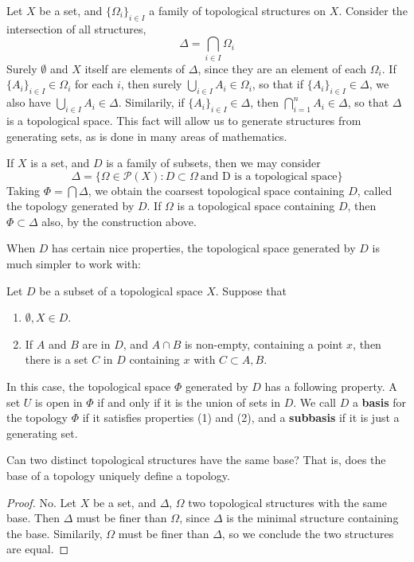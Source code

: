 Let $X$ be a set, and $\{\Omega_i\}_{i \in I}$ a family of topological structures on $X$. Consider the intersection of all structures,
%
\[ \Delta = \bigcap_{i \in I} \Omega_i \]
%
Surely $\emptyset$ and $X$ itself are elements of $\Delta$, since they are an element of each $\Omega_i$. If $\{A_i\}_{i \in I} \in \Omega_i$ for each $i$, then surely $\bigcup_{i \in I} A_i \in \Omega_i$, so that if $\{A_i\}_{i \in I} \in \Delta$, we also have $\bigcup_{i \in I} A_i \in \Delta$. Similarily, if $\{A_i\}_{i \in I} \in \Delta$, then $\bigcap_{i = 1}^n A_i \in \Delta$, so that $\Delta$ is a topological space. This fact will allow us to generate structures from generating sets, as is done in many areas of mathematics.

If $X$ is a set, and $D$ is a family of subsets, then we may consider
%
\[ \Delta = \{ \Omega \in \mathcal{P}(X) : D \subset \Omega\ \text{and D is a topological space} \} \]
%
Taking $\Phi = \bigcap \Delta$, we obtain the coarsest topological space containing $D$, called the topology generated by $D$. If $\Omega$ is a topological space containing $D$, then $\Phi \subset \Delta$ also, by the construction above.

When $D$ has certain nice properties, the topological space generated by $D$ is much simpler to work with:

\begin{definition}
    Let $D$ be a subset of a topological space $X$. Suppose that
    \begin{enumerate}
        \item $\emptyset, X \in D$.
        \item If $A$ and $B$ are in $D$, and $A \cap B$ is non-empty, containing a point $x$, then there is a set $C$ in $D$ containing $x$ with $C \subset A, B$.
    \end{enumerate}
    In this case, the topological space $\Phi$ generated by $D$ has a following property. A set $U$ is open in $\Phi$ if and only if it is the union of sets in $D$. We call $D$ a {\bf basis} for the topology $\Phi$ if it satisfies properties (1) and (2), and a {\bf subbasis} if it is just a generating set.
\end{definition}

\begin{exercise}
    Can two distinct topological structures have the same base? That is, does the base of a topology uniquely define a topology.
\end{exercise}
\begin{proof}
    No. Let $X$ be a set, and $\Delta$, $\Omega$ two topological structures with the same base. Then $\Delta$ must be finer than $\Omega$, since $\Delta$ is the minimal structure containing the base. Similarily, $\Omega$ must be finer than $\Delta$, so we conclude the two structures are equal.
\end{proof}


